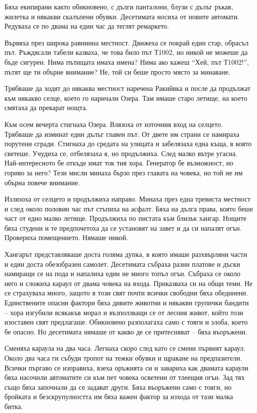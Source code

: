 \documentclass[ebook,openany,12pt]{memoir}
\begin{document}
Бяха екипирани както обикновено, с дълги панталони, блузи с дълъг ръкав, жилетка и някакви скалъпени обувки. Десетимата носиха от новите автомати. Редуваха се по двама на един час да теглят ремаркето.

Вървяха през широка равнинна местност. Движеха се покрай един стар, обрасъл път. Ръждясали табели казваха, че това било път Т1002, но никой не можеше да бъде сигурен. Нима пътищата имаха имена? Нима ако кажеш ``Хей, път Т1002!'', пътят ще ти обърне внимание? Не, той си беше просто място за минаване. 

Трябваше да ходят до някаква местност наречена Ракийвка и после да продължат към някакво селце, което го наричали Озера. Там имаше старо летище, на което смятаха да прекарат нощта.

Към осем вечерта стигнаха Озера. Влязоха от източния вход на селцето. Трябваше да изминат един дълъг главен път. От двете им страни се намираха порутени сгради. Стигнаха до средата на улицата и забелязаха една къща, в която светеше. Учудиха се, отбелязаха я, но продължиха. След малко вътре угасна. Най-интересното бе откъде имат ток тия хора. Генератор бе възможност, но гориво за него? Тези мисли минаха бързо през главата на човека, но той не им обърна повече внимание.

Излязоха от селцето и продължиха направо. Минаха през една тревиста местност и след около половин час път стъпиха на асфалт. Бяха на дълга права, която беше част от едно малко летище. Продължиха по пистата към близък хангар. Нощите бяха студени и те предпочетоха да се установят на завет и да си напалят огън. Провериха помещението. Нямаше никой.

Хангарът представляваше доста голяма дупка, в която имаше разхвърляни части и един доста обезобразен самолет. Десетимата събраха разни платове и дъски намиращи се на пода и напалиха един не много топъл огън. Събраха се около него и сложиха караул от двама човека на входа. Приказваха си на общи теми. Не се страхуваха много, защото в този свят почти всички свободни бяха обединени. Единствените опасни фактори бяха дивите животни и някакви групички бандити – хора изгубили всякакъв морал и възползващи се от лесния живот, който този изоставен свят предлагаше. Обикновено разполагаха само с тояги и злоба, което бе опасно. Но десетимата нямаше от какво де се притесняват – бяха въоръжени.

Сменяха караула на два часа. Легнаха скоро след като се смени първият караул. Около два часа ги събуди тропот на тежки обувки и щракане на предпазители. Всички пъргаво се изправиха, взеха оръжията си и завариха как двамата караули бяха насочили автоматите си към пет човека осветени от тлеещия огън. Зад тях също бяха започнали да се задават други. Бяха въоръжени само с тояги, но бройката и безскрупулността им бяха важен фактор за изхода от тази малка битка.
\end{document}
